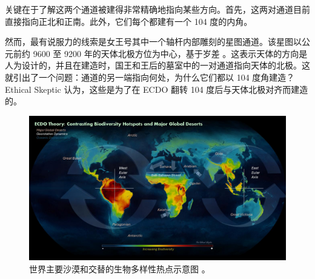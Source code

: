 \documentclass[10pt,twocolumn,letterpaper]{article}
\begin{document}
关键在于了解这两个通道被建得非常精确地指向某些方向。首先，这两对通道目前直接指向正北和正南。此外，它们每个都建有一个 104 度的内角。

然而，最有说服力的线索是女王号其中一个轴杆内部雕刻的星图通道。该星图以公元前约 9600 至 9200 年的天体北极方位为中心，基于岁差 \cite{28}。这表示天体的方向是人为设计的，并且在建造时，国王和王后的墓室中的一对通道指向天体的北极。这就引出了一个问题：通道的另一端指向何处，为什么它们都以 104 度角建造？Ethical Skeptic 认为，这些是为了在 ECDO 翻转 104 度后与天体北极对齐而建造的。

\begin{figure}[t]
\begin{center}
\includegraphics[width=1\textwidth]{biodiversity.jpg}
\end{center}
   \caption{世界主要沙漠和交替的生物多样性热点示意图 \cite{28}。}
\label{fig:9}
\end{figure}
\end{document}
